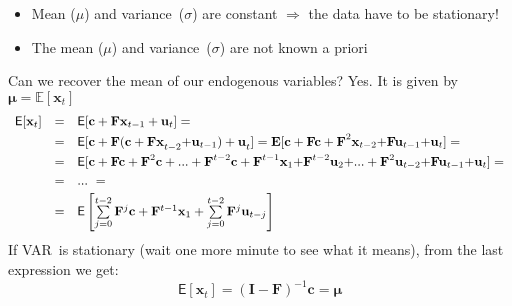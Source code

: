 \documentclass[11pt,a4paper]{report}
\numberwithin{equation}{chapter}
\numberwithin{section}{chapter}
\begin{document}
\begin{itemize}
\item Mean ($\mu $) and variance\ ($\sigma $) are constant $\Longrightarrow $
the data have to be stationary!

\item The mean ($\mu $) and variance\ ($\sigma $) are not known a priori
\end{itemize}

\noindent Can we recover the mean of our endogenous variables? Yes. It is
given by $\mathbf{\mu }=\mathbb{E}[\mathbf{x}_{t}]$%
\begin{equation*}
\begin{array}{lll}
\mathsf{E}[\mathbf{x}_{t}] & = & \mathsf{E}[\mathbf{c}+\mathbf{Fx}_{t-1}+%
\mathbf{u}_{t}]=\smallskip \\ 
& = & \mathsf{E}[\mathbf{c+F(c+Fx}_{t-2}\mathbf{+u}_{t-1}\mathbf{)+u}_{t}%
\mathbf{]=E[c+Fc+F}^{2}\mathbf{x}_{t-2}\mathbf{+Fu}_{t-1}\mathbf{+u}_{t}%
\mathbf{]=}\smallskip \\ 
& = & \mathsf{E}[\mathbf{c+Fc+F}^{2}\mathbf{c+...+F}^{t-2}\mathbf{c+F}^{t-1}%
\mathbf{x}_{1}\mathbf{+F}^{t-2}\mathbf{u}_{2}\mathbf{+...+F}^{2}\mathbf{u}%
_{t-2}\mathbf{+Fu}_{t-1}\mathbf{+u}_{t}]=\smallskip \\ 
& = & ...\ =\smallskip \\ 
& = & \mathsf{E}\left[ \sum\limits_{j=0}^{t-2}\mathbf{F}^{j}\mathbf{c}+%
\mathbf{F}^{t-1}\mathbf{x}_{1}+\sum\limits_{j=0}^{t-2}\mathbf{F}^{j}\mathbf{u%
}_{t-j}\right]%
\end{array}%
\end{equation*}%
If VAR\ is stationary (wait one more minute to see what it means), from the
last expression we get:%
\begin{equation*}
\mathsf{E}[\mathbf{x}_{t}]=\left( \mathbf{I}-\mathbf{F}\right) ^{-1}\mathbf{c%
}=\mathbf{\mu }
\end{equation*}
\end{document}
